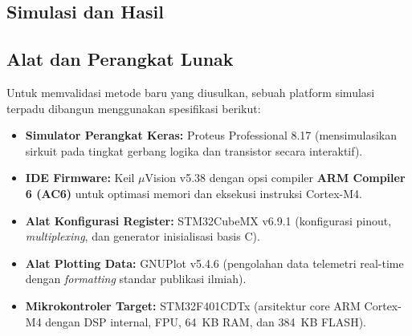 \documentclass[11pt,a4paper]{article}
\begin{document}
\begin{longtable}
\section{Simulasi dan Hasil}
\subsection{Alat dan Perangkat Lunak}
\hspace{1.5em}Untuk memvalidasi metode baru yang diusulkan, sebuah platform simulasi terpadu dibangun menggunakan spesifikasi berikut:
\begin{itemize}
    \item \textbf{Simulator Perangkat Keras:} Proteus Professional 8.17 (mensimulasikan sirkuit pada tingkat gerbang logika dan transistor secara interaktif).
    \item \textbf{IDE Firmware:} Keil $\mu$Vision v5.38 dengan opsi compiler \textbf{ARM Compiler 6 (AC6)} untuk optimasi memori dan eksekusi instruksi Cortex-M4.
    \item \textbf{Alat Konfigurasi Register:} STM32CubeMX v6.9.1 (konfigurasi pinout, \textit{multiplexing}, dan generator inisialisasi basis C).
    \item \textbf{Alat Plotting Data:} GNUPlot v5.4.6 (pengolahan data telemetri real-time dengan \textit{formatting} standar publikasi ilmiah).
    \item \textbf{Mikrokontroler Target:} STM32F401CDTx (arsitektur core ARM Cortex-M4 dengan DSP internal, FPU, 64~KB RAM, dan 384~KB FLASH).
\end{itemize}


\end{longtable}
\end{document}
